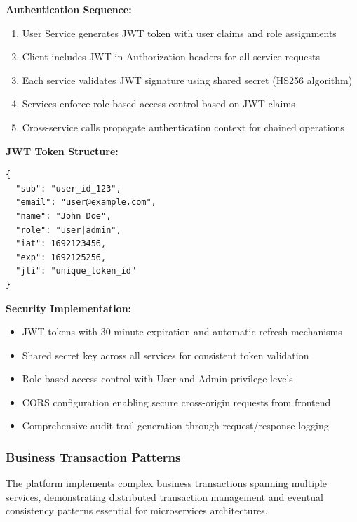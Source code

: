 \textbf{Authentication Sequence:}
\begin{enumerate}
\item User Service generates JWT token with user claims and role assignments
\item Client includes JWT in Authorization headers for all service requests
\item Each service validates JWT signature using shared secret (HS256 algorithm)
\item Services enforce role-based access control based on JWT claims
\item Cross-service calls propagate authentication context for chained operations
\end{enumerate}

\textbf{JWT Token Structure:}
\begin{verbatim}
{
  "sub": "user_id_123",
  "email": "user@example.com",
  "name": "John Doe", 
  "role": "user|admin",
  "iat": 1692123456,
  "exp": 1692125256,
  "jti": "unique_token_id"
}
\end{verbatim}

\textbf{Security Implementation:}
\begin{itemize}
\item JWT tokens with 30-minute expiration and automatic refresh mechanisms
\item Shared secret key across all services for consistent token validation
\item Role-based access control with User and Admin privilege levels
\item CORS configuration enabling secure cross-origin requests from frontend
\item Comprehensive audit trail generation through request/response logging
\end{itemize}

\subsubsection{Business Transaction Patterns}

The platform implements complex business transactions spanning multiple services, demonstrating distributed transaction management and eventual consistency patterns essential for microservices architectures.

